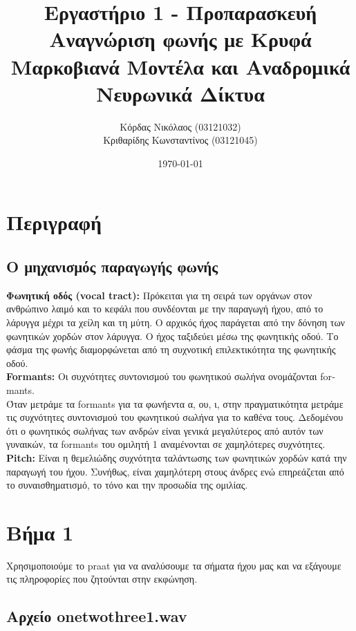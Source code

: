 \documentclass[11pt,a4paper]{article}
\title{\textbf{Εργαστήριο 1 - Προπαρασκευή} \\ \bigskip
\large Αναγνώριση φωνής με Κρυφά Μαρκοβιανά Μοντέλα και Αναδρομικά Νευρωνικά Δίκτυα}
\author{Κόρδας Νικόλαος (03121032) \\
        Κριθαρίδης Κωνσταντίνος (03121045) \\
        }
\date{\today}
\begin{document}
\maketitle

\section*{Περιγραφή}

\subsection*{Ο μηχανισμός παραγωγής φωνής}

\textbf{Φωνητική οδός (\foreignlanguage{english}{vocal tract}):} Πρόκειται για τη σειρά των οργάνων στον ανθρώπινο λαιμό και το κεφάλι που συνδέονται με την παραγωγή ήχου, από το λάρυγγα μέχρι τα χείλη και τη μύτη. Ο αρχικός ήχος παράγεται από την δόνηση των φωνητικών χορδών στον λάρυγγα. 
Ο ήχος ταξιδεύει μέσω της φωνητικής οδού. Το φάσμα της φωνής διαμορφώνεται από τη συχνοτική επιλεκτικότητα της φωνητικής οδού. \\

\noindent \textbf{\foreignlanguage{english}{Formants}:} Οι συχνότητες συντονισμού του φωνητικού σωλήνα ονομάζονται \foreignlanguage{english}{formants}. \\
\noindent Όταν μετράμε τα \foreignlanguage{english}{formants} για τα φωνήεντα α, ου, ι, στην πραγματικότητα μετράμε τις συχνότητες συντονισμού του φωνητικού σωλήνα για το καθένα τους. Δεδομένου ότι ο φωνητικός σωλήνας των ανδρών είναι γενικά μεγαλύτερος από αυτόν των γυναικών, τα formants του ομιλητή 1 αναμένονται σε χαμηλότερες συχνότητες. \\

\noindent \textbf{\foreignlanguage{english}{Pitch}:} Είναι η θεμελιώδης συχνότητα ταλάντωσης των φωνητικών χορδών κατά την παραγωγή του ήχου. Συνήθως, είναι χαμηλότερη στους άνδρες ενώ επηρεάζεται από το συναισθηματισμό, το τόνο και την προσωδία της ομιλίας. \cite{RabinerSchafer1978} \\


\section*{Βήμα 1}

Χρησιμοποιούμε το praat για να αναλύσουμε τα σήματα ήχου μας και να εξάγουμε τις πληροφορίες που ζητούνται στην εκφώνηση.

\subsection*{Αρχείο onetwothree1.wav}
\end{document}
